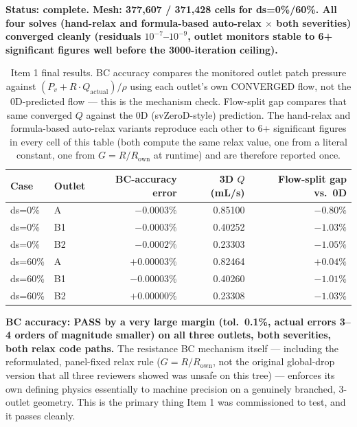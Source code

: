 \documentclass[11pt]{article}
\newcommand{\PASS}{\textcolor{passgreen}{\textbf{PASS}}}
\begin{document}
\textbf{Status: complete. Mesh: 377,607 / 371,428 cells for ds=0\%/60\%. All four solves (hand-relax
and formula-based auto-relax $\times$ both severities) converged cleanly (residuals $10^{-7}$--$10^{-9}$,
outlet monitors stable to 6+ significant figures well before the 3000-iteration ceiling).}

\begin{table}[H]
\centering
\caption{Item 1 final results. BC accuracy compares the monitored outlet patch pressure against
$(P_v+R\cdot Q_\text{actual})/\rho$ using each outlet's own CONVERGED flow, not the 0D-predicted flow
--- this is the mechanism check. Flow-split gap compares that same converged $Q$ against the 0D
(svZeroD-style) prediction. The hand-relax and formula-based auto-relax variants reproduce each other
to 6+ significant figures in every cell of this table (both compute the same relax value, one from a
literal constant, one from $G=R/R_\text{own}$ at runtime) and are therefore reported once.}
\begin{tabular}{llrrr}
\toprule
Case & Outlet & BC-accuracy error & 3D $Q$ (mL/s) & Flow-split gap vs.\ 0D \\
\midrule
ds=0\% & A  & $-0.0003\%$ & 0.85100 & $-0.80\%$ \\
ds=0\% & B1 & $-0.0003\%$ & 0.40252 & $-1.03\%$ \\
ds=0\% & B2 & $-0.0002\%$ & 0.23303 & $-1.05\%$ \\
ds=60\% & A  & $+0.00003\%$ & 0.82464 & $+0.04\%$ \\
ds=60\% & B1 & $-0.00003\%$ & 0.40260 & $-1.01\%$ \\
ds=60\% & B2 & $+0.00000\%$ & 0.23308 & $-1.03\%$ \\
\bottomrule
\end{tabular}
\end{table}

\textbf{BC accuracy: \PASS{} by a very large margin (tol.\ 0.1\%, actual errors 3--4 orders of
magnitude smaller) on all three outlets, both severities, both relax code paths.} The resistance BC
mechanism itself --- including the reformulated, panel-fixed relax rule ($G=R/R_\text{own}$, not the
original global-drop version that all three reviewers showed was unsafe on this tree) --- enforces its
own defining physics essentially to machine precision on a genuinely branched, 3-outlet geometry. This
is the primary thing Item 1 was commissioned to test, and it passes cleanly.
\end{document}

